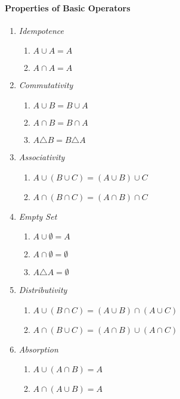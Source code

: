 \documentclass[10pt,twoside,twocolumn]{article}
\begin{document}
\paragraph{Properties of Basic Operators}
\begin{enumerate}
\item \emph{Idempotence}

\begin{enumerate}
\item $A\cup A=A$
\item $A\cap A=A$
\end{enumerate}
\item \emph{Commutativity}

\begin{enumerate}
\item $A\cup B=B\cup A$
\item $A\cap B=B\cap A$
\item $A\triangle B=B\triangle A$
\end{enumerate}
\item \emph{Associativity}

\begin{enumerate}
\item $A\cup\left(B\cup C\right)=\left(A\cup B\right)\cup C$
\item $A\cap\left(B\cap C\right)=\left(A\cap B\right)\cap C$
\end{enumerate}
\item \emph{Empty Set}

\begin{enumerate}
\item $A\cup\emptyset=A$
\item $A\cap\emptyset=\emptyset$
\item $A\triangle A=\emptyset$
\end{enumerate}
\item \emph{Distributivity}

\begin{enumerate}
\item $A\cup\left(B\cap C\right)=\left(A\cup B\right)\cap\left(A\cup C\right)$
\item $A\cap\left(B\cup C\right)=\left(A\cap B\right)\cup\left(A\cap C\right)$
\end{enumerate}
\item \emph{Absorption}

\begin{enumerate}
\item $A\cup\left(A\cap B\right)=A$
\item $A\cap\left(A\cup B\right)=A$
\end{enumerate}
\end{enumerate}
\end{document}
